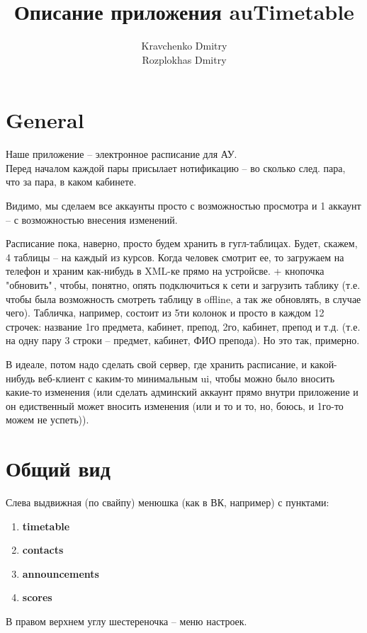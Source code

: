 \documentclass[12pt]{article}
\title{\textbf{Описание приложения auTimetable}}
\author{Kravchenko Dmitry\\
		Rozplokhas Dmitry}
\date{}
\begin{document}
\maketitle

\section*{General}
Наше приложение -- электронное расписание для АУ.\\
Перед началом каждой пары присылает нотификацию -- во сколько след. пара, 
что за пара, в каком кабинете.

Видимо, мы сделаем все аккаунты просто с возможностью просмотра и 1 аккаунт --
с возможностью внесения изменений.

Расписание пока, наверно, просто будем хранить в гугл-таблицах. Будет, скажем,
4 таблицы -- на каждый из курсов. Когда человек смотрит ее, то загружаем
на телефон и храним как-нибудь в XML-ке прямо на устройсве. + кнопочка 
"обновить"\,, чтобы, понятно, опять подключиться к сети и загрузить
таблику (т.е. чтобы была возможность смотреть таблицу в offline, а так же
обновлять, в случае чего). Табличка, например, состоит из 5ти колонок
и просто в каждом 12 строчек: название 1го предмета, кабинет, препод, 2го, 
кабинет, препод и т.д. (т.е. на одну пару 3 строки -- предмет, кабинет, ФИО 
препода). Но это так, примерно.

В идеале, потом надо сделать свой сервер, где хранить расписание, и какой-
нибудь веб-клиент с каким-то минимальным ui, чтобы можно было вносить какие-то
изменения (или сделать админский аккаунт прямо внутри приложение и он 
едиственный может вносить изменения (или и то и то, но, боюсь, и 1го-то
можем не успеть)).
\section{Общий вид}
Слева выдвижная (по свайпу) менюшка (как в ВК, например) с пунктами:
\begin{enumerate}
\item
	\textbf{timetable}
\item
	\textbf{contacts}
\item
	\textbf{announcements}
\item
	\textbf{scores}
\end{enumerate}

В правом верхнем углу шестереночка -- меню настроек.
\end{document}
